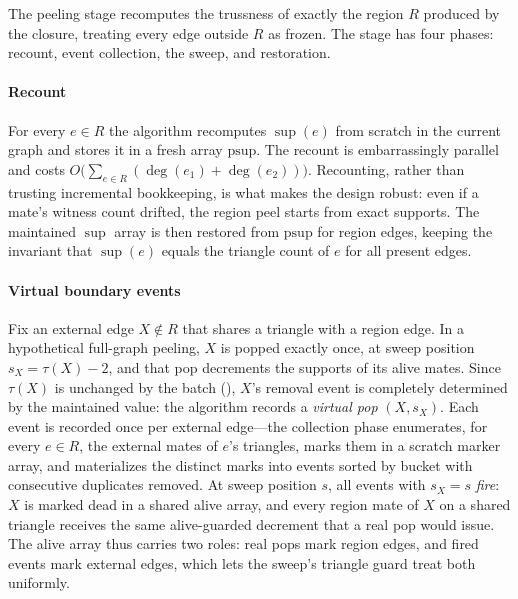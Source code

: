 \label{sec:method-peel}

The peeling stage recomputes the trussness of exactly the region $R$ produced by the closure, treating every edge outside $R$ as frozen.
The stage has four phases: recount, event collection, the sweep, and restoration.

\paragraph{Recount}
For every $e\in R$ the algorithm recomputes $\sup(e)$ from scratch in the current graph and stores it in a fresh array $\mathrm{psup}$.
The recount is embarrassingly parallel and costs $O\!\big(\sum_{e\in R}(\deg(e_1)+\deg(e_2))\big)$.
Recounting, rather than trusting incremental bookkeeping, is what makes the design robust: even if a mate's witness count drifted, the region peel starts from exact supports.
The maintained $\sup$ array is then restored from $\mathrm{psup}$ for region edges, keeping the invariant that $\sup(e)$ equals the triangle count of $e$ for all present edges.

\paragraph{Virtual boundary events}
Fix an external edge $X\notin R$ that shares a triangle with a region edge.
In a hypothetical full-graph peeling, $X$ is popped exactly once, at sweep position $s_X=\tau(X)-2$, and that pop decrements the supports of its alive mates.
Since $\tau(X)$ is unchanged by the batch (), $X$'s removal event is completely determined by the maintained value: the algorithm records a \emph{virtual pop} $(X, s_X)$.
Each event is recorded once per external edge---the collection phase enumerates, for every $e\in R$, the external mates of $e$'s triangles, marks them in a scratch marker array, and materializes the distinct marks into events sorted by bucket with consecutive duplicates removed.
At sweep position $s$, all events with $s_X=s$ \emph{fire}: $X$ is marked dead in a shared alive array, and every region mate of $X$ on a shared triangle receives the same alive-guarded decrement that a real pop would issue.
The alive array thus carries two roles: real pops mark region edges, and fired events mark external edges, which lets the sweep's triangle guard treat both uniformly.

